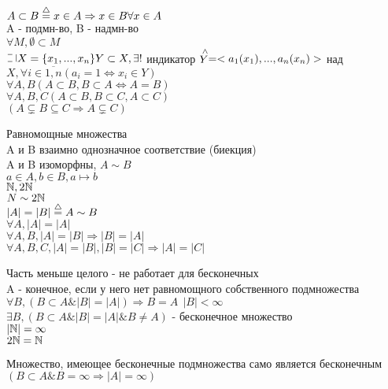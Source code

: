 $ A \subset B \stackrel{\triangle}{=} x \in A \Rightarrow x \in B \forall x \in A $ \\
A - подмн-во, B - надмн-во \\
$ \forall M, \emptyset \subset M $ \\
$ \letus X = \{ x_1, ..., x_n \} Y \subset X, \exists! $ индикатор $ \stackrel{\wedge}{Y} = < a_1(x_1), ..., a_n(x_n) > $ над $ X, \forall i \in \overline{1, n} (a_i = 1 \Leftrightarrow x_i \in Y)  $ \\
$ \forall A,B (A \subset B, B \subset A \Leftrightarrow A = B) $ \\
$ \forall A,B,C ( A \subset B, B \subset C, A \subset C) $ \\
$ (A \varsubsetneq B \subseteq C \Rightarrow A \varsubsetneq C)  $\\
\begin{definition}
	Равномощные множества \\
	A и B взаимно однозначное соответствие (биекция) \\
	A и B изоморфны, $ A \sim B $ \\
	$ a \in A, b \in B, a \mapsto b $ \\
	$ \mathbb{N}, 2\mathbb{N} $ \\
	$ N \sim 2\mathbb{N} $ \\
	$ |A| =|B| \stackrel{\triangle}{=} A \sim B $\\
	$ \forall A, |A| = |A| $ \\
	$ \forall A,B, |A| = |B| \Rightarrow |B| = |A| $ \\
	$\forall A,B,C, |A|=|B|, |B|=|C| \Rightarrow |A| = |C| $ 
\end{definition}
Часть меньше целого - не работает для бесконечных \\
A - конечное, если у него нет равномощного собственного подмножества \\
$ \forall B, (B \subset A \& |B|=|A|) \Rightarrow B = A  \ \ |B| < \infty$ \\
$ \exists B, (B \subset A \& |B| = |A| \& B \neq A) $ - бесконечное множество \\
$ |\mathbb{N}| = \infty $ \\
$ 2 \mathbb{N} = \mathbb{N} $ \\
\begin{theorem}
	Множество,  имеющее бесконечные подмножества само является бесконечным \\
	$ (B \subset A \& B = \infty \Rightarrow |A| = \infty) $ 	
\end{theorem}

